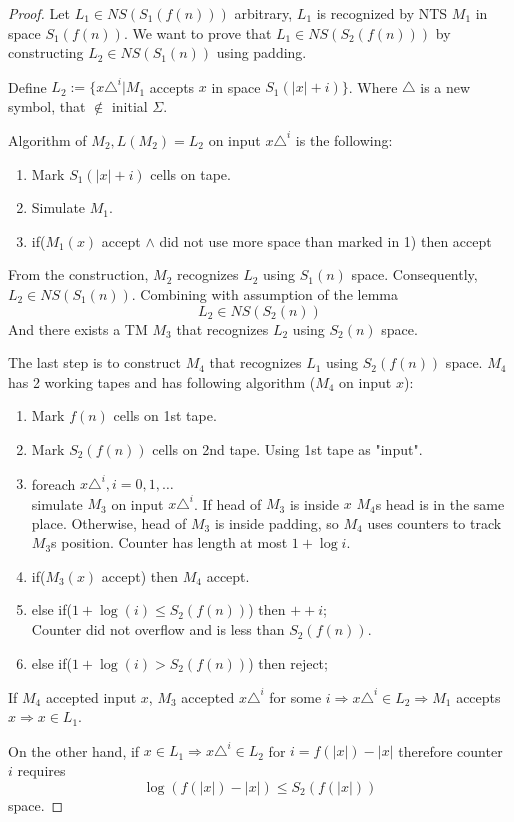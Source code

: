 \begin{proof}
	Let $L_1 \in NS(S_1(f(n)))$ arbitrary, $L_1$ is recognized by NTS $M_1$ in space $S_1(f(n))$.
	We want to prove that $L_1 \in NS(S_2(f(n)))$ by constructing $L_2 \in NS(S_1(n))$ using padding.

	Define $L_2 := \{ x\triangle^i | M_1 $ accepts $x$ in space $S_1(|x| + i) \} $.
	Where $\triangle$ is a new symbol, that $\notin $ initial $\Sigma$.

	Algorithm of $M_2, L(M_2) = L_2$ on input $x\triangle^i$ is the following:
\begin{enumerate}
	\item Mark $S_1(|x| + i)$ cells on tape.
	\item Simulate $M_1$.
	\item if($M_1(x)$ accept $\land$ did not use more space than marked in 1) then accept
\end{enumerate}
	From the construction, $M_2$ recognizes $L_2$ using $S_1(n)$ space.
	Consequently, $L_2 \in NS(S_1(n))$.
	Combining with assumption of the lemma
	\[ L_2 \in NS(S_2(n)) \]
	And there exists a TM $M_3$ that recognizes $L_2$ using $S_2(n)$ space.

	The last step is to construct $M_4$ that recognizes $L_1$ using $S_2(f(n))$ space.
	$M_4$ has 2 working tapes and has following algorithm ($M_4$ on input $x$):
\begin{enumerate}
	\item Mark $f(n)$ cells on 1st tape.
	\item Mark $S_2(f(n))$ cells on 2nd tape. Using 1st tape as "input".
	\item foreach $x\triangle^i, i = 0, 1, \ldots $ \\
		simulate $M_3$ on input $x\triangle^i$.
		If head of $M_3$ is inside $x$ $M_4$s head is in the same place.
		Otherwise, head of $M_3$ is inside padding, so $M_4$ uses counters to track $M_3$s position.
		Counter has length at most $1 + \log i$.
	\item if($M_3(x)$ accept) then $M_4$ accept.
	\item else if($1 + \log(i) \leq S_2(f(n))$) then $++i$; \\
		Counter did not overflow and is less than $S_2(f(n))$.
	\item else if($1 + \log(i) > S_2(f(n))$) then reject;
\end{enumerate}

If $M_4$ accepted input $x$, $M_3$ accepted $x\triangle^i$ for some $i \Rightarrow x\triangle^i \in L_2 \Rightarrow M_1$ accepts $x \Rightarrow x \in L_1$.

On the other hand, if $x \in L_1 \Rightarrow x\triangle^i \in L_2$ for $i = f(|x|) - |x|$ therefore counter $i$ requires
\[ \log(f(|x|) - |x|) \leq S_2(f(|x|)) \]
space.

\end{proof}

